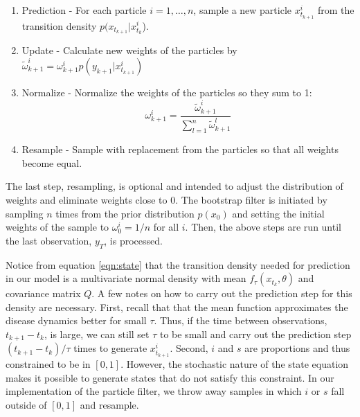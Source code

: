 \documentclass{article}
\begin{document}
\begin{enumerate}
\item Prediction - For each particle $i = {1,\ldots,n}$, sample a new particle $x_{t_{k+1}}^i$ from the transition density $p(x_{t_{k+1}}|x_{t_k}^i$).
\item Update - Calculate new weights of the particles by $\tilde{\omega}_{k+1}^i = \omega_{k+1}^i p(y_{k+1}|x_{t_{k+1}}^i)$
\item Normalize - Normalize the weights of the particles so they sum to 1: \[\omega_{k+1}^i = \frac{\tilde{\omega}_{k+1}^i}{\sum_{l=1}^n \tilde{\omega}_{k+1}^l}\]
\item Resample - Sample with replacement from the particles so that all weights become equal.
\end{enumerate}

\noindent The last step, resampling, is optional and intended to adjust the distribution of weights and eliminate weights close to 0.  The bootstrap filter is initiated by sampling $n$ times from the prior distribution $p(x_0)$ and setting the initial weights of the sample to $\omega_0^i = 1/n$ for all $i$.  Then, the above steps are run until the last observation, $y_T$, is processed.

Notice from equation \eqref{eqn:state} that the transition density needed for prediction in our model is a multivariate normal density with mean $f_\tau(x_{t_k},\theta)$ and covariance matrix $Q$.  A few notes on how to carry out the prediction step for this density are necessary. First, recall that that the mean function approximates the disease dynamics better for small $\tau$.  Thus, if the time between observations, $t_{k+1} - t_k$, is large, we can still set $\tau$ to be small and carry out the prediction step $(t_{k+1} - t_k) / \tau$ times to generate $x_{t_{k+1}}^i$.  Second, $i$ and $s$ are proportions and thus constrained to be in $[0,1]$.  However, the stochastic nature of the state equation makes it possible to generate states that do not satisfy this constraint.  In our implementation of the particle filter, we throw away samples in which $i$ or $s$ fall outside of $[0,1]$ and resample.
\end{document}
